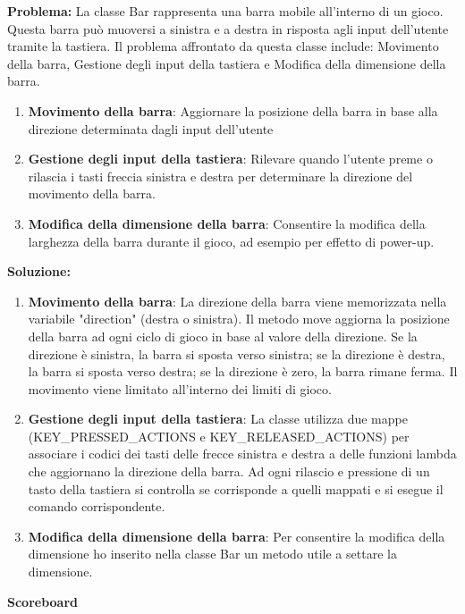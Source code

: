 \documentclass[a4paper,12pt]{report}
\begin{document}
{\textbf{Problema:}} La classe Bar rappresenta una barra mobile all'interno di un gioco. Questa barra può muoversi a sinistra e a destra in risposta agli input dell'utente tramite la tastiera. Il problema affrontato da questa classe include: Movimento della barra, Gestione degli input della tastiera e Modifica della dimensione della barra.
\newline
\begin{enumerate}
\item \textbf{Movimento della barra}: Aggiornare la posizione della barra in base alla direzione determinata dagli input dell'utente
\item \textbf{Gestione degli input della tastiera}: Rilevare quando l'utente preme o rilascia i tasti freccia sinistra e destra per determinare la direzione del movimento della barra.
\item \textbf{Modifica della dimensione della barra}: Consentire la modifica della larghezza della barra durante il gioco, ad esempio per effetto di power-up. 
\end{enumerate}
{\textbf{Soluzione:}}
\begin{enumerate}
\item \textbf{Movimento della barra}: La direzione della barra viene memorizzata nella variabile "direction" (destra o sinistra). Il metodo move aggiorna la posizione della barra ad ogni ciclo di gioco in base al valore della direzione. Se la direzione è sinistra, la barra si sposta verso sinistra; se la direzione è destra, la barra si sposta verso destra; se la direzione è zero, la barra rimane ferma. Il movimento viene limitato all'interno dei limiti di gioco. \newline
\item \textbf{Gestione degli input della tastiera}: La classe utilizza due mappe (KEY\_PRESSED\_ACTIONS e KEY\_RELEASED\_ACTIONS) per associare i codici dei tasti delle frecce sinistra e destra a delle funzioni lambda che aggiornano la direzione della barra. Ad ogni rilascio e pressione di un tasto della tastiera si controlla se corrisponde a quelli mappati e si esegue il comando corrispondente.
\item \textbf{Modifica della dimensione della barra}: Per consentire la modifica della dimensione ho inserito nella classe Bar un metodo utile a settare la dimensione.\newline \newline
\end{enumerate}
\textbf{Scoreboard}\newline \newline
\end{document}
